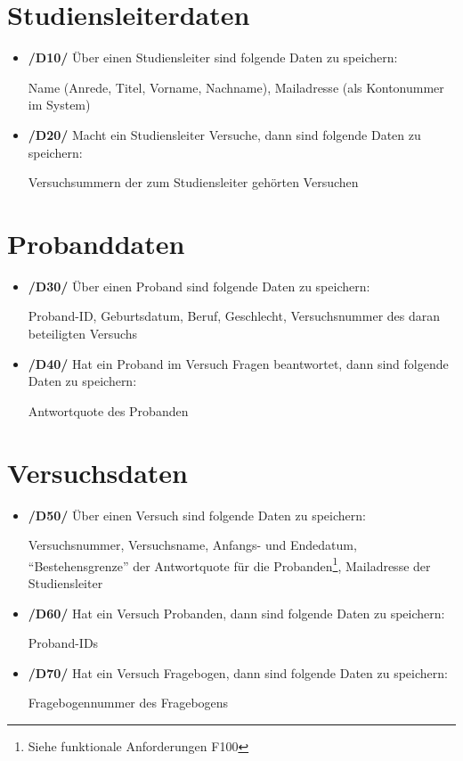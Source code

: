 \documentclass[a4paper]{scrreprt}
\begin{document}
        \section{\gls{Studiensleiter}daten}
            \begin{itemize}
                \item \textbf{/D10/} Über einen \gls{Studiensleiter} sind folgende Daten zu speichern:
                    \par Name (Anrede, Titel, Vorname, Nachname), Mailadresse (als Kontonummer im System)

                \item \textbf{/D20/} Macht ein \gls{Studiensleiter} Versuche, dann sind folgende Daten zu speichern:
                    \par Versuchsummern der zum \gls{Studiensleiter} gehörten Versuchen
            \end{itemize}

        \section{\gls{Proband}daten}
            \begin{itemize}
                \item \textbf{/D30/} Über einen \gls{Proband} sind folgende Daten zu speichern:
                    \par \gls{Proband}-ID, Geburtsdatum, Beruf, Geschlecht, Versuchsnummer des daran beteiligten Versuchs

                \item \textbf{/D40/} Hat ein \gls{Proband} im Versuch Fragen beantwortet, dann sind folgende Daten zu speichern:
                    \par \gls{Antwortquote} des \gls{Proband}en
            \end{itemize}

        \section{Versuchsdaten}
            \begin{itemize}
                \item \textbf{/D50/} Über einen Versuch sind folgende Daten zu speichern:
                    \par Versuchsnummer, Versuchsname, Anfangs- und Endedatum, “Bestehensgrenze” der \gls{Antwortquote} für die \gls{Proband}en\footnote{Siehe funktionale Anforderungen F100}, Mailadresse der \gls{Studiensleiter}

                \item \textbf{/D60/} Hat ein Versuch \gls{Proband}en, dann sind folgende Daten zu speichern:
                    \par \gls{Proband}-IDs

                \item \textbf{/D70/} Hat ein Versuch Fragebogen, dann sind folgende Daten zu speichern:
                    \par Fragebogennummer des Fragebogens
            \end{itemize}
\end{document}
